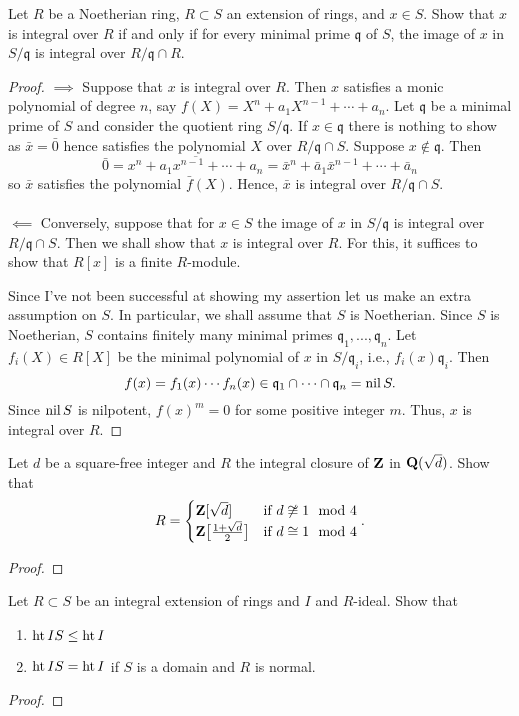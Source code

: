 \begin{problem}
Let $R$ be a Noetherian ring, $R\subset S$ an extension of rings,
and $x\in S$. Show that $x$ is integral over $R$ if and only if
for every minimal prime $\mathfrak{q}$ of $S$, the image of $x$
in $S/\mathfrak{q}$ is integral over $R/\mathfrak{q}\cap R$.
\end{problem}
\begin{proof}
$\implies$ Suppose that $x$ is integral over $R$. Then $x$ satisfies a
monic polynomial of degree $n$, say $f(X)=X^n+a_1X^{n-1}+\cdots+a_n$. Let
$\mathfrak{q}$ be a minimal prime of $S$ and consider the quotient ring
$S/\mathfrak{q}$. If $x\in\mathfrak{q}$ there is nothing to show as $\bar
x=\bar 0$ hence satisfies the polynomial $X$ over $R/\mathfrak{q}\cap
S$. Suppose $x\notin\mathfrak{q}$. Then
\[
\bar 0=\overline{x^n+a_1x^{n-1}+\cdots+a_n}
=\bar x^n+\bar a_1\bar x^{n-1}+\cdots+\bar a_n
\]
so $\bar x$ satisfies the polynomial $\bar f(X)$. Hence, $\bar x$ is
integral over $R/\mathfrak{q}\cap S$.
\\\\
$\impliedby$ Conversely, suppose that for $x\in S$ the image of $x$ in
$S/\mathfrak{q}$ is integral over $R/\mathfrak{q}\cap S$. Then we shall
show that $x$ is integral over $R$. For this, it suffices to show that
$R[x]$ is a finite $R$-module.

Since I've not been successful at showing my assertion let us make an extra
assumption on $S$. In particular, we shall assume that $S$ is
Noetherian. Since $S$ is Noetherian, $S$ contains finitely many minimal
primes $\mathfrak{q}_1,...,\mathfrak{q}_n$. Let $f_i(X)\in R[X]$ be the
minimal polynomial of $x$ in $S/\mathfrak{q}_i$, i.e.,
$f_i(x)\mathfrak{q}_i$. Then
\[
f(x)=f_1(x)\cdots f_n(x)\in\mathfrak{q}_1\cap\cdots\cap\mathfrak{q}_n=\operatorname{nil} S.
\]
Since $\operatorname{nil} S$ is nilpotent, $f(x)^m=0$ for some positive integer
$m$. Thus, $x$ is integral over $R$.
\end{proof}
\newpage
\begin{problem}
Let $d$ be a square-free integer and $R$ the integral closure of
$\mathbf{Z}$ in $\mathbf{Q}(\sqrt{d})$. Show that
\[
R=
\begin{cases}
\mathbf{Z}[\sqrt{d}]&\text{if $d\not\cong 1\mod 4$}\\
\mathbf{Z}\bigl[\frac{1+\sqrt{d}}{2}\bigr]&\text{if $d\cong 1\mod 4$}
\end{cases}.
\]
\end{problem}
\begin{proof}
\end{proof}
\newpage
\begin{problem}
Let $R\subset S$ be an integral extension of rings and $I$ and
$R$-ideal. Show that
\begin{enumerate}[label=(\alph*)]
\item $\operatorname{ht} IS\leq\operatorname{ht} I$
\item $\operatorname{ht} IS=\operatorname{ht} I$ if $S$ is a domain and $R$ is normal.
\end{enumerate}
\end{problem}
\begin{proof}
\end{proof}

